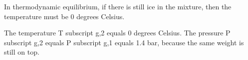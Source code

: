 In thermodynamic equilibrium, if there is still ice in the mixture, then the temperature must be 0 degrees Celsius.

The temperature T subscript g,2 equals 0 degrees Celsius.
The pressure P subscript g,2 equals P subscript g,1 equals 1.4 bar, because the same weight is still on top.